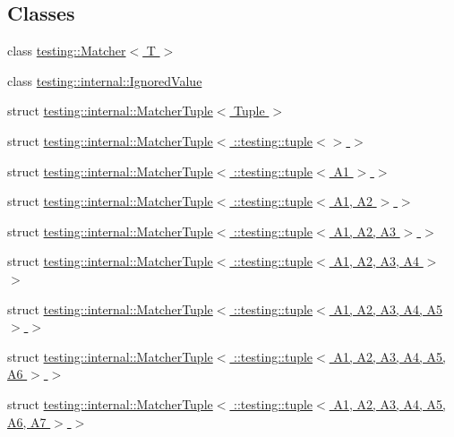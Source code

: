 \subsection*{Classes}
\begin{DoxyCompactItemize}
\item 
class \hyperlink{classtesting_1_1_matcher}{testing\+::\+Matcher$<$ T $>$}
\item 
class \hyperlink{classtesting_1_1internal_1_1_ignored_value}{testing\+::internal\+::\+Ignored\+Value}
\item 
struct \hyperlink{structtesting_1_1internal_1_1_matcher_tuple}{testing\+::internal\+::\+Matcher\+Tuple$<$ Tuple $>$}
\item 
struct \hyperlink{structtesting_1_1internal_1_1_matcher_tuple_3_01_1_1testing_1_1tuple_3_4_01_4}{testing\+::internal\+::\+Matcher\+Tuple$<$ \+::testing\+::tuple$<$$>$ $>$}
\item 
struct \hyperlink{structtesting_1_1internal_1_1_matcher_tuple_3_01_1_1testing_1_1tuple_3_01_a1_01_4_01_4}{testing\+::internal\+::\+Matcher\+Tuple$<$ \+::testing\+::tuple$<$ A1 $>$ $>$}
\item 
struct \hyperlink{structtesting_1_1internal_1_1_matcher_tuple_3_01_1_1testing_1_1tuple_3_01_a1_00_01_a2_01_4_01_4}{testing\+::internal\+::\+Matcher\+Tuple$<$ \+::testing\+::tuple$<$ A1, A2 $>$ $>$}
\item 
struct \hyperlink{structtesting_1_1internal_1_1_matcher_tuple_3_01_1_1testing_1_1tuple_3_01_a1_00_01_a2_00_01_a3_01_4_01_4}{testing\+::internal\+::\+Matcher\+Tuple$<$ \+::testing\+::tuple$<$ A1, A2, A3 $>$ $>$}
\item 
struct \hyperlink{structtesting_1_1internal_1_1_matcher_tuple_3_01_1_1testing_1_1tuple_3_01_a1_00_01_a2_00_01_a3_00_01_a4_01_4_01_4}{testing\+::internal\+::\+Matcher\+Tuple$<$ \+::testing\+::tuple$<$ A1, A2, A3, A4 $>$ $>$}
\item 
struct \hyperlink{structtesting_1_1internal_1_1_matcher_tuple_3_01_1_1testing_1_1tuple_3_01_a1_00_01_a2_00_01_a3_00_01_a4_00_01_a5_01_4_01_4}{testing\+::internal\+::\+Matcher\+Tuple$<$ \+::testing\+::tuple$<$ A1, A2, A3, A4, A5 $>$ $>$}
\item 
struct \hyperlink{structtesting_1_1internal_1_1_matcher_tuple_3_01_1_1testing_1_1tuple_3_01_a1_00_01_a2_00_01_a3_0fb935efcf1b84fbc4f177777ca3392dc}{testing\+::internal\+::\+Matcher\+Tuple$<$ \+::testing\+::tuple$<$ A1, A2, A3, A4, A5, A6 $>$ $>$}
\item 
struct \hyperlink{structtesting_1_1internal_1_1_matcher_tuple_3_01_1_1testing_1_1tuple_3_01_a1_00_01_a2_00_01_a3_0064798126035aa0d3ca935c3449bf0c1}{testing\+::internal\+::\+Matcher\+Tuple$<$ \+::testing\+::tuple$<$ A1, A2, A3, A4, A5, A6, A7 $>$ $>$}

\end{DoxyCompactItemize}
